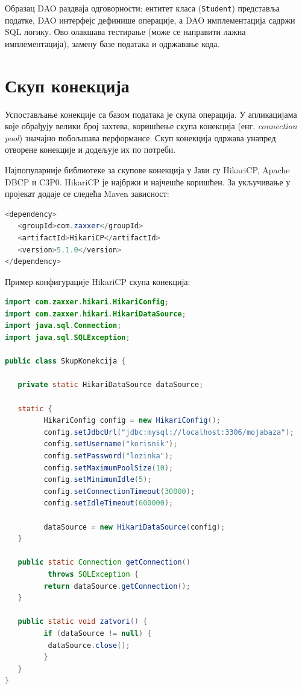 Образац DAO раздваја одговорности: ентитет класа (\texttt{Student}) представља податке, DAO интерфејс дефинише операције, а DAO имплементација садржи SQL логику. Ово олакшава тестирање (може се направити лажна имплементација), замену базе података и одржавање кода.


\section{Скуп конекција}

Успостављање конекције са базом података је скупа операција. У апликацијама које обрађују велики број захтева, коришћење скупа конекција (енг. \textit{connection pool}) значајно побољшава перформансе. Скуп конекција одржава унапред отворене конекције и додељује их по потреби.

Најпопуларније библиотеке за скупове конекција у Јави су HikariCP, Apache DBCP и C3P0. HikariCP је најбржи и најчешће коришћен. За укључивање у пројекат додаје се следећа Maven зависност:


\begin{lstlisting}[language=Java]
<dependency>
   <groupId>com.zaxxer</groupId>
   <artifactId>HikariCP</artifactId>
   <version>5.1.0</version>
</dependency>
\end{lstlisting}


Пример конфигурације HikariCP скупа конекција:


\begin{lstlisting}[language=Java]
import com.zaxxer.hikari.HikariConfig;
import com.zaxxer.hikari.HikariDataSource;
import java.sql.Connection;
import java.sql.SQLException;
 
public class SkupKonekcija {
 
   private static HikariDataSource dataSource;
 
   static {
         HikariConfig config = new HikariConfig();
         config.setJdbcUrl("jdbc:mysql://localhost:3306/mojabaza");
         config.setUsername("korisnik");
         config.setPassword("lozinka");
         config.setMaximumPoolSize(10);
         config.setMinimumIdle(5);
         config.setConnectionTimeout(30000);
         config.setIdleTimeout(600000);
 
         dataSource = new HikariDataSource(config);
   }
 
   public static Connection getConnection()
          throws SQLException {
         return dataSource.getConnection();
   }
 
   public static void zatvori() {
         if (dataSource != null) {
          dataSource.close();
         }
   }
}
\end{lstlisting}


